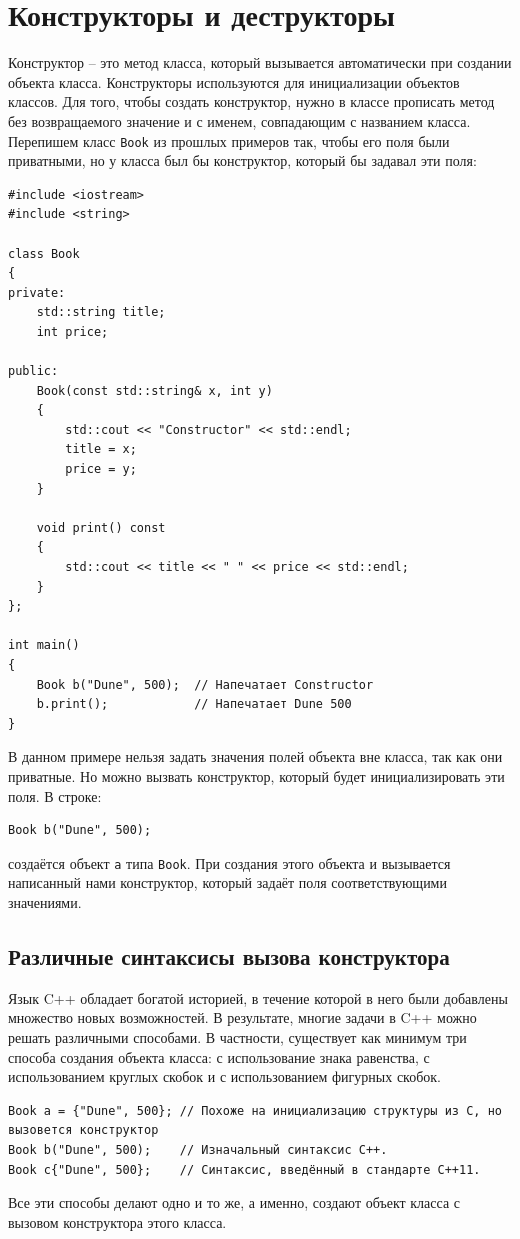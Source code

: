 \documentclass{article}
\begin{document}
\newpage
\section*{Конструкторы и деструкторы}
Конструктор -- это метод класса, который вызывается автоматически при создании объекта класса. Конструкторы используются для инициализации объектов классов. Для того, чтобы создать конструктор, нужно в классе прописать метод без возвращаемого значение и с именем, совпадающим с названием класса. Перепишем класс \texttt{Book} из прошлых примеров так, чтобы его поля были приватными, но у класса был бы конструктор, который бы задавал эти поля:
\begin{lstlisting}
#include <iostream>
#include <string>

class Book 
{
private:
    std::string title;
    int price;
    
public:
	Book(const std::string& x, int y)
	{
		std::cout << "Constructor" << std::endl;
		title = x;
		price = y;
	}

    void print() const
    {
        std::cout << title << " " << price << std::endl;
    }
};

int main() 
{
    Book b("Dune", 500);  // Напечатает Constructor
    b.print();			  // Напечатает Dune 500
}
\end{lstlisting}
В данном примере нельзя задать значения полей объекта вне класса, так как они приватные. Но можно вызвать конструктор, который будет инициализировать эти поля. В строке:
\begin{lstlisting}
Book b("Dune", 500);
\end{lstlisting}
создаётся объект \texttt{a} типа \texttt{Book}. При создания этого объекта и вызывается написанный нами конструктор, который задаёт поля соответствующими значениями.

\subsection*{Различные синтаксисы вызова конструктора}
Язык C++ обладает богатой историей, в течение которой в него были добавлены множество новых возможностей. В результате, многие задачи в C++ можно решать различными способами. В частности, существует как минимум три способа создания объекта класса: с использование знака равенства, с использованием круглых скобок и с использованием фигурных скобок.
\begin{lstlisting}
Book a = {"Dune", 500}; // Похоже на инициализацию структуры из C, но вызовется конструктор
Book b("Dune", 500);    // Изначальный синтаксис C++.
Book c{"Dune", 500};    // Синтаксис, введённый в стандарте C++11.
\end{lstlisting}
Все эти способы делают одно и то же, а именно, создают объект класса с вызовом конструктора этого класса.\\
\newpage
\end{document}
